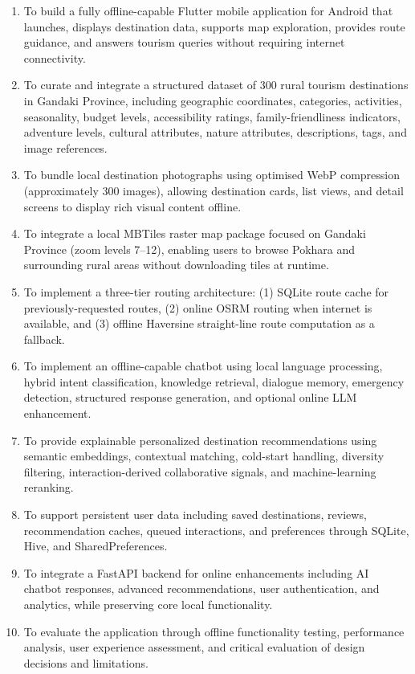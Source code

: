 \documentclass[12pt,a4paper,oneside]{report}
\begin{document}
\begin{enumerate}
\item To build a fully offline-capable Flutter mobile application for Android that launches, displays destination data, supports map exploration, provides route guidance, and answers tourism queries without requiring internet connectivity.

\item To curate and integrate a structured dataset of 300 rural tourism destinations in Gandaki Province, including geographic coordinates, categories, activities, seasonality, budget levels, accessibility ratings, family-friendliness indicators, adventure levels, cultural attributes, nature attributes, descriptions, tags, and image references.

\item To bundle local destination photographs using optimised WebP compression (approximately 300 images), allowing destination cards, list views, and detail screens to display rich visual content offline.

\item To integrate a local MBTiles raster map package focused on Gandaki Province (zoom levels 7--12), enabling users to browse Pokhara and surrounding rural areas without downloading tiles at runtime.

\item To implement a three-tier routing architecture: (1) SQLite route cache for previously-requested routes, (2) online OSRM routing when internet is available, and (3) offline Haversine straight-line route computation as a fallback.

\item To implement an offline-capable chatbot using local language processing, hybrid intent classification, knowledge retrieval, dialogue memory, emergency detection, structured response generation, and optional online LLM enhancement.

\item To provide explainable personalized destination recommendations using semantic embeddings, contextual matching, cold-start handling, diversity filtering, interaction-derived collaborative signals, and machine-learning reranking.

\item To support persistent user data including saved destinations, reviews, recommendation caches, queued interactions, and preferences through SQLite, Hive, and SharedPreferences.

\item To integrate a FastAPI backend for online enhancements including AI chatbot responses, advanced recommendations, user authentication, and analytics, while preserving core local functionality.

\item To evaluate the application through offline functionality testing, performance analysis, user experience assessment, and critical evaluation of design decisions and limitations.
\end{enumerate}
\end{document}
